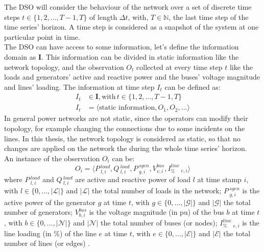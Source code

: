 The \gls{DSO} will consider the behaviour of the network over a set of discrete time steps $t \in \{1,2,...,T-1,T\}$ of length $\Delta t$, with, $T \in \mathbb{N}$, the last time step of the time series’ horizon. A time step is considered as a snapshot of the system at one particular point in time. \\ 

The \gls{DSO} can have access to some information, let's define the information domain as $\textbf{I}$. This information can be divided in static information like the network topology, and the observation $O_t$ collected at every time step $t$ like the loads and generators' active and reactive power and the buses' voltage magnitude and lines' loading. The information at time step $I_t$ can be defined as:
\begin{align*}
    I_t & \in \textbf{I}, \text{with} \, t \in \{1,2,...,T-1,T\} \\
    I_t & = \langle\text{static information}, O_1, O_2, ...\rangle
\end{align*}
\noindent In general power networks are not static, since the operators can modify their topology, for example changing the connections due to some incidents on the lines. In this thesis, the network topology is considered as static, so that no changes are applied on the network the during the whole time series' horizon.\\

\noindent An instance of the observation $O_i$ can be:
\begin{equation*}
    O_i = \langle P\,^{load}_{l,i}, Q\,^{load}_{l,i}, P\,^{sgen}_{g,i}, V^{bus}_{v,i}, I^{line}_{\%}\,_{e,i} \rangle
\end{equation*}
\noindent where $P\,^{load}_{l,i}$ and $Q\,^{load}_{l,i}$ are active and reactive power of load $l$ at time stamp $i$, with $l \in \{0, ..., |\mathcal{L}|\}$ and $|\mathcal{L}|$ the total number of loads in the network; 
$P\,^{sgen}_{g,i}$ is the active power of the generator $g$ at time $t$, with $g \in \{0, ..., |\mathcal{G}|\}$ and $|\mathcal{G}|$ the total number of generators; 
$V^{bus}_{b,i}$ is the voltage magnitude (in \gls{pu}) of the bus $b$ at time $t$, with $b \in \{0, ..., |\mathcal{N}|\}$ and $|\mathcal{N}|$ the total number of buses (or nodes);
$I^{line}_{\%}\,_{e,i}$ is the line loading (in $\%$) of the line $e$ at time $t$, with $e \in \{0, ..., |\mathcal{E}|\}$ and $|\mathcal{E}|$ the total number of lines (or edges)
.\\

